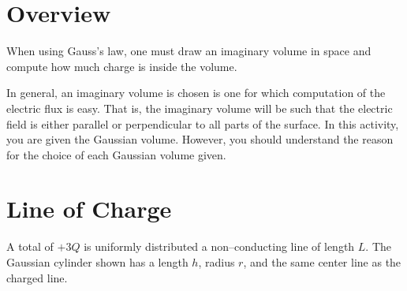 \documentclass{article}
\begin{document}
\section{Overview}

When using Gauss's law, one must draw an imaginary volume in space and compute how much charge is inside the volume.

In general, an imaginary volume is chosen is one for which computation of the electric flux is easy. That is, the imaginary volume will be such that the electric field is either parallel or perpendicular to all parts of the surface. In this activity, you are given the Gaussian volume. However, you should understand the reason for the choice of each Gaussian volume given.

\section{Line of Charge}

A total of $+3Q$ is uniformly distributed a non--conducting line of length $L$. The Gaussian cylinder shown has a length $h$, radius $r$, and the same center line as the charged line.


\end{document}
